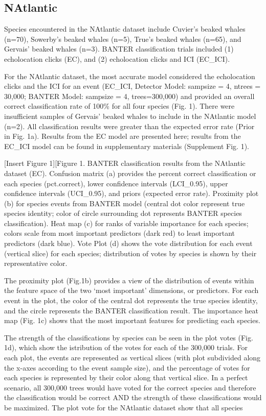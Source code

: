\documentclass[
  letterpaper,
  DIV=11,
  numbers=noendperiod]{scrartcl}
\begin{document}
\hypertarget{natlantic}{%
\subsection{NAtlantic}\label{natlantic}}

Species encountered in the NAtlantic dataset include Cuvier's beaked
whales (n=70), Sowerby's beaked whales (n=5), True's beaked whales
(n=65), and Gervais' beaked whales (n=3). BANTER classification trials
included (1) echolocation clicks (EC), and (2) echolocation clicks and
ICI (EC\_ICI).

For the NAtlantic dataset, the most accurate model considered the
echolocation clicks and the ICI for an event (EC\_ICI, Detector Model:
sampsize = 4, ntrees = 30,000; BANTER Model: sampsize = 4,
trees=300,000) and provided an overall correct classification rate of
100\% for all four species (Fig. 1). There were insufficient samples of
Gervais' beaked whales to include in the NAtlantic model (n=2). All
classification results were greater than the expected error rate (Prior
in Fig. 1a). Results from the EC model are presented here; results from
the EC\_ICI model can be found in supplementary materials (Supplement
Fig. 1).

{[}Insert Figure 1{]}{[}Figure 1. BANTER classification results from the
NAtlantic dataset (EC). Confusion matrix (a) provides the percent
correct classification or each species (pct.correct), lower confidence
intervals (LCI\_0.95), upper confidence intervals (UCI\_0.95), and
priors (expected error rate). Proximity plot (b) for species events from
BANTER model (central dot color represent true species identity; color
of circle surrounding dot represents BANTER species classification).
Heat map (c) for ranks of variable importance for each species; colors
scale from most important predictors (dark red) to least important
predictors (dark blue). Vote Plot (d) shows the vote distribution for
each event (vertical slice) for each species; distribution of votes by
species is shown by their representative color.

The proximity plot (Fig.1b) provides a view of the distribution of
events within the feature space of the two `most important' dimensions,
or predictors. For each event in the plot, the color of the central dot
represents the true species identity, and the circle represents the
BANTER classification result. The importance heat map (Fig. 1c) shows
that the most important features for predicting each species.

The strength of the classifications by species can be seen in the plot
votes (Fig. 1d), which show the istribution of the votes for each of the
300,000 trials. For each plot, the events are represented as vertical
slices (with plot subdivided along the x-axes according to the event
sample size), and the percentage of votes for each species is
represented by their color along that vertical slice. In a perfect
scenario, all 300,000 trees would have voted for the correct species and
therefore the classification would be correct AND the strength of these
classifications would be maximized. The plot vote for the NAtlantic
dataset show that all species
\end{document}

